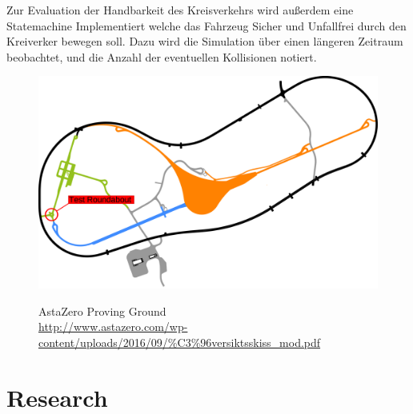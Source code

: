 \documentclass[11pt,oneside,openright]{mpreport}
\begin{document}
Zur Evaluation der Handbarkeit des Kreisverkehrs wird außerdem eine Statemachine Implementiert welche das Fahrzeug Sicher und Unfallfrei
durch den Kreiverker bewegen soll. Dazu wird die Simulation über einen längeren Zeitraum beobachtet, und die Anzahl der eventuellen
Kollisionen notiert.

\begin{figure}[!ht]
\caption{AstaZero Proving Ground\\ \url{http://www.astazero.com/wp-content/uploads/2016/09/\%C3\%96versiktsskiss_mod.pdf} }
\includegraphics[width=\textwidth]{bilder/AstaZero.pdf}
\label{astazero}
\end{figure}



\chapter{Research}
\end{document}
